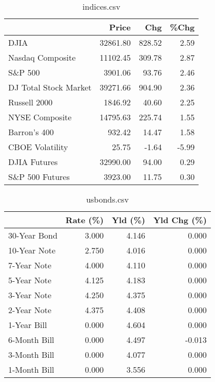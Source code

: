 \documentclass{article}%
\begin{document}
%


\begin{table}[htbp]%
\caption{indices.csv}%
\centering%
\begin{adjustbox}{width=1\textwidth}%
\begin{tabular}{lrrr}
\toprule
                      &    Price &    Chg &  \%Chg \\
\midrule
                 DJIA & 32861.80 & 828.52 &  2.59 \\
     Nasdaq Composite & 11102.45 & 309.78 &  2.87 \\
              S\&P 500 &  3901.06 &  93.76 &  2.46 \\
DJ Total Stock Market & 39271.66 & 904.90 &  2.36 \\
         Russell 2000 &  1846.92 &  40.60 &  2.25 \\
       NYSE Composite & 14795.63 & 225.74 &  1.55 \\
         Barron's 400 &   932.42 &  14.47 &  1.58 \\
      CBOE Volatility &    25.75 &  -1.64 & -5.99 \\
         DJIA Futures & 32990.00 &  94.00 &  0.29 \\
      S\&P 500 Futures &  3923.00 &  11.75 &  0.30 \\
\bottomrule
\end{tabular}
%
\end{adjustbox}%
\end{table}

%


\begin{table}[htbp]%
\caption{usbonds.csv}%
\centering%
\begin{adjustbox}{width=1\textwidth}%
\begin{tabular}{lrrr}
\toprule
             &  Rate (\%) &  Yld (\%) &  Yld Chg (\%) \\
\midrule
30-Year Bond &     3.000 &    4.146 &        0.000 \\
10-Year Note &     2.750 &    4.016 &        0.000 \\
 7-Year Note &     4.000 &    4.110 &        0.000 \\
 5-Year Note &     4.125 &    4.183 &        0.000 \\
 3-Year Note &     4.250 &    4.375 &        0.000 \\
 2-Year Note &     4.375 &    4.408 &        0.000 \\
 1-Year Bill &     0.000 &    4.604 &        0.000 \\
6-Month Bill &     0.000 &    4.497 &       -0.013 \\
3-Month Bill &     0.000 &    4.077 &        0.000 \\
1-Month Bill &     0.000 &    3.556 &        0.000 \\
\bottomrule
\end{tabular}
%
\end{adjustbox}%
\end{table}
\end{document}
